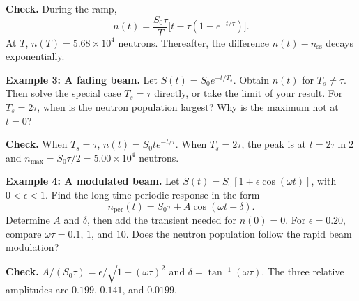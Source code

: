 \documentclass[compact]{ne630handout}
\begin{document}
\begin{handoutflow}
\vspace{5pt}

{\color{wcprimary}\small
\textbf{Check.} During the ramp,
\[
 n(t)=\frac{S_0\tau}{T}\big[t-\tau(1-e^{-t/\tau})\big].
\]
At $T$, $n(T)=5.68\times10^4$ neutrons. Thereafter, the difference
$n(t)-n_{\mathrm{ss}}$ decays exponentially.\par}

\vfill

\textbf{Example 3: A fading beam.} Let $S(t)=S_0e^{-t/T_s}$.
Obtain $n(t)$ for $T_s\ne\tau$. Then solve the special case $T_s=\tau$
directly, or take the limit of your result. For $T_s=2\tau$, when is
the neutron population largest? Why is the maximum not at $t=0$?

\vspace{5pt}

{\color{wcprimary}\small
\textbf{Check.} When $T_s=\tau$, $n(t)=S_0t e^{-t/\tau}$.
When $T_s=2\tau$, the peak is at $t=2\tau\ln2$ and
$n_{\max}=S_0\tau/2=5.00\times10^4$ neutrons.\par}

\vfill

\textbf{Example 4: A modulated beam.} Let
$S(t)=S_0[1+\epsilon\cos(\omega t)]$, with $0<\epsilon<1$.
Find the long-time periodic response in the form
\[
 n_{\mathrm{per}}(t)=S_0\tau+A\cos(\omega t-\delta).
\]
Determine $A$ and $\delta$, then add the transient needed for $n(0)=0$.
For $\epsilon=0.20$, compare $\omega\tau=0.1$, $1$, and $10$.
Does the neutron population follow the rapid beam modulation?

\vspace{5pt}

{\color{wcprimary}\small
\textbf{Check.} $A/(S_0\tau)=\epsilon/\sqrt{1+(\omega\tau)^2}$ and
$\delta=\tan^{-1}(\omega\tau)$. The three relative amplitudes are
$0.199$, $0.141$, and $0.0199$.\par}

\end{handoutflow}
\end{document}
